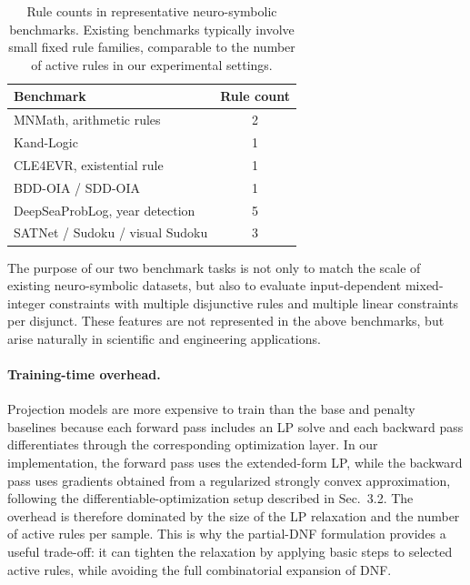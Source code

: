 \documentclass{article}
\theoremstyle{plain}
\theoremstyle{definition}
\theoremstyle{remark}
\begin{document}
\begin{table}[h]
\centering
\caption{Rule counts in representative neuro-symbolic benchmarks. Existing benchmarks typically involve small fixed rule families, comparable to the number of active rules in our experimental settings.}
\label{tab:benchmark-rule-counts}
\begin{tabular}{lc}
\toprule
Benchmark & Rule count \\
\midrule
MNMath, arithmetic rules & 2 \\
Kand-Logic & 1 \\
CLE4EVR, existential rule & 1 \\
BDD-OIA / SDD-OIA & 1 \\
DeepSeaProbLog, year detection & 5 \\
SATNet / Sudoku / visual Sudoku & 3 \\
\bottomrule
\end{tabular}
\end{table}

The purpose of our two benchmark tasks is not only to match the scale of existing neuro-symbolic datasets, but also to evaluate input-dependent mixed-integer constraints with multiple disjunctive rules and multiple linear constraints per disjunct. These features are not represented in the above benchmarks, but arise naturally in scientific and engineering applications.

\paragraph{Training-time overhead.}
Projection models are more expensive to train than the base and penalty baselines because each forward pass includes an LP solve and each backward pass differentiates through the corresponding optimization layer. In our implementation, the forward pass uses the extended-form LP, while the backward pass uses gradients obtained from a regularized strongly convex approximation, following the differentiable-optimization setup described in Sec.~3.2. The overhead is therefore dominated by the size of the LP relaxation and the number of active rules per sample. This is why the partial-DNF formulation provides a useful trade-off: it can tighten the relaxation by applying basic steps to selected active rules, while avoiding the full combinatorial expansion of DNF.

\end{document}
